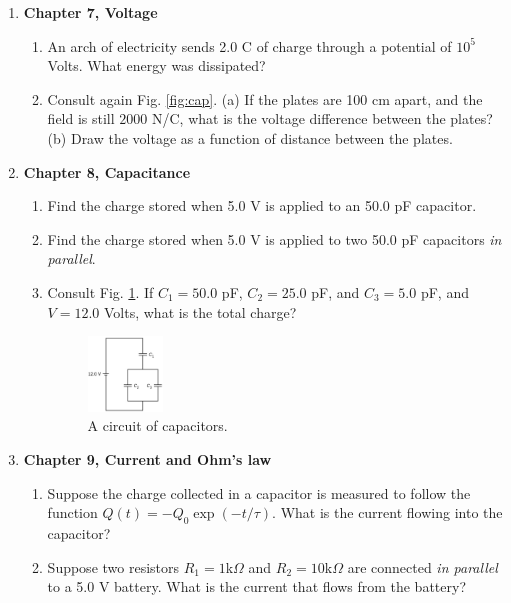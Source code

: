 \documentclass[10pt]{article}
\begin{document}
\begin{enumerate}
\begin{enumerate}
\end{enumerate}
\item \textbf{Chapter 7, Voltage}
\begin{enumerate}
\item An arch of electricity sends 2.0 C of charge through a potential of $10^5$ Volts. What energy was dissipated? \\ \vspace{2cm}
\item Consult again Fig. \ref{fig:cap}.  (a) If the plates are 100 cm apart, and the field is still $2000$ N/C, what is the voltage difference between the plates? (b) Draw the voltage as a function of distance between the plates. \\ \vspace{2cm}
\end{enumerate}
\item \textbf{Chapter 8, Capacitance}
\begin{enumerate}
\item Find the charge stored when 5.0 V is applied to an 50.0 pF capacitor. \\ \vspace{1cm}
\item Find the charge stored when 5.0 V is applied to two 50.0 pF capacitors \textit{in parallel}. \\ \vspace{1cm}
\item Consult Fig. \ref{fig:cap2}.  If $C_1 = 50.0$ pF, $C_2 = 25.0$ pF, and $C_3 = 5.0$ pF, and $V=12.0$ Volts, what is the total charge? \\ \vspace{1.5cm}
\begin{figure}
\centering
\includegraphics[width=0.2\textwidth]{figures/cap2.png}
\caption{\label{fig:cap2} A circuit of capacitors.}
\end{figure}
\end{enumerate}
\item \textbf{Chapter 9, Current and Ohm's law}
\begin{enumerate}
\item Suppose the charge collected in a capacitor is measured to follow the function $Q(t) = - Q_0 \exp(-t/\tau)$.  What is the current flowing into the capacitor? \\ \vspace{1cm}
\item Suppose two resistors $R_1=1$k$\Omega$ and $R_2=10$k$\Omega$ are connected \textit{in parallel} to a 5.0 V battery.  What is the current that flows from the battery?
\end{enumerate}
\end{enumerate}
\end{document}
